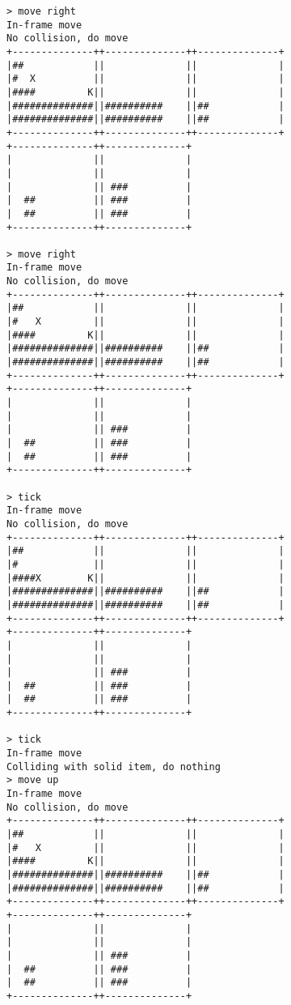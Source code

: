 \begin{verbatim}
> move right
In-frame move
No collision, do move
+--------------++--------------++--------------+
|##            ||              ||              |
|#  X          ||              ||              |
|####         K||              ||              |
|##############||##########    ||##            |
|##############||##########    ||##            |
+--------------++--------------++--------------+
+--------------++--------------+                
|              ||              |                
|              ||              |                
|              || ###          |                
|  ##          || ###          |                
|  ##          || ###          |                
+--------------++--------------+                

> move right
In-frame move
No collision, do move
+--------------++--------------++--------------+
|##            ||              ||              |
|#   X         ||              ||              |
|####         K||              ||              |
|##############||##########    ||##            |
|##############||##########    ||##            |
+--------------++--------------++--------------+
+--------------++--------------+                
|              ||              |                
|              ||              |                
|              || ###          |                
|  ##          || ###          |                
|  ##          || ###          |                
+--------------++--------------+                

> tick
In-frame move
No collision, do move
+--------------++--------------++--------------+
|##            ||              ||              |
|#             ||              ||              |
|####X        K||              ||              |
|##############||##########    ||##            |
|##############||##########    ||##            |
+--------------++--------------++--------------+
+--------------++--------------+                
|              ||              |                
|              ||              |                
|              || ###          |                
|  ##          || ###          |                
|  ##          || ###          |                
+--------------++--------------+                

> tick
In-frame move
Colliding with solid item, do nothing
> move up
In-frame move
No collision, do move
+--------------++--------------++--------------+
|##            ||              ||              |
|#   X         ||              ||              |
|####         K||              ||              |
|##############||##########    ||##            |
|##############||##########    ||##            |
+--------------++--------------++--------------+
+--------------++--------------+                
|              ||              |                
|              ||              |                
|              || ###          |                
|  ##          || ###          |                
|  ##          || ###          |                
+--------------++--------------+                


\end{verbatim}
